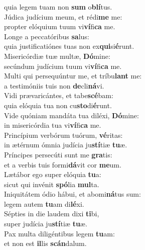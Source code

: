 \oddverse quia legem tuam non \textbf{sum} o\textbf{blí}tus.\\
\evenverse Júdica judícium meum, et rédi\textbf{me} me:~\*\\
\evenverse propter elóquium tuum vi\textbf{ví}fi\textbf{ca} me.\\
\oddverse Longe a peccatóribus \textbf{sa}lus:~\*\\
\oddverse quia justificatiónes tuas non ex\textbf{qui}si\textbf{é}runt.\\
\evenverse Misericórdiæ tuæ multæ, \textbf{Dó}mine:~\*\\
\evenverse secúndum judícium tuum vi\textbf{ví}fi\textbf{ca} me.\\
\oddverse Multi qui persequúntur me, et tríbu\textbf{lant} me:~\*\\
\oddverse a testimóniis tuis non \textbf{de}cli\textbf{ná}vi.\\
\evenverse Vidi prævaricántes, et tabe\textbf{scé}bam:~\*\\
\evenverse quia elóquia tua non cu\textbf{sto}di\textbf{é}runt.\\
\oddverse Vide quóniam mandáta tua diléxi, \textbf{Dó}mine:~\*\\
\oddverse in misericórdia tua vi\textbf{ví}fi\textbf{ca} me.\\
\evenverse Princípium verbórum tuórum, \textbf{vé}ritas:~\*\\
\evenverse in ætérnum ómnia judícia ju\textbf{stí}tiæ \textbf{tu}æ.\\
\oddverse Príncipes persecúti sunt me \textbf{gra}tis:~\*\\
\oddverse et a verbis tuis formi\textbf{dá}vit cor \textbf{me}um.\\
\evenverse Lætábor ego super elóquia \textbf{tu}a:~\*\\
\evenverse sicut qui invénit \textbf{spó}lia \textbf{mul}ta.\\
\oddverse Iniquitátem ódio hábui, et abomi\textbf{ná}tus sum:~\*\\
\oddverse legem autem \textbf{tu}am di\textbf{lé}xi.\\
\evenverse Sépties in die laudem dixi \textbf{ti}bi,~\*\\
\evenverse super judícia ju\textbf{stí}tiæ \textbf{tu}æ.\\
\oddverse Pax multa diligéntibus legem \textbf{tu}am:~\*\\
\oddverse et non est \textbf{il}lis \textbf{scán}dalum.\\
